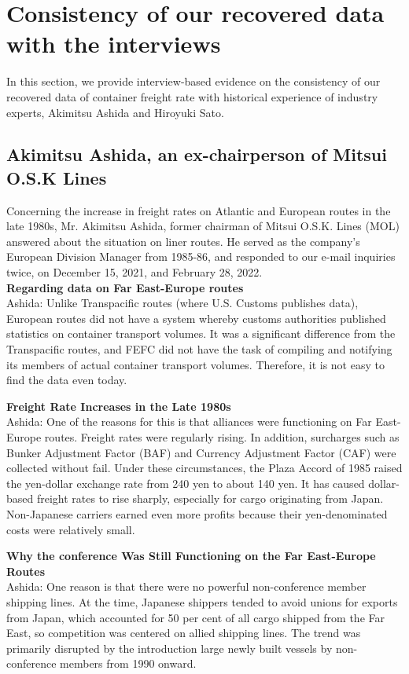 \section{Consistency of our recovered data with the interviews}\label{sec:interview}

In this section, we provide interview-based evidence on the consistency of our recovered data of container freight rate with historical experience of industry experts, Akimitsu Ashida and Hiroyuki Sato.

\subsection{Akimitsu Ashida, an ex-chairperson of Mitsui O.S.K Lines}

Concerning the increase in freight rates on Atlantic and European routes in the late 1980s, Mr. Akimitsu Ashida, former chairman of Mitsui O.S.K. Lines (MOL) answered about the situation on liner routes. He served as the company's European Division Manager from 1985-86, and responded to our e-mail inquiries twice, on December 15, 2021, and February 28, 2022.\\

\textbf{Regarding data on Far East-Europe routes} \\
Ashida: Unlike Transpacific routes (where U.S. Customs publishes data), European routes did not have a system whereby customs authorities published statistics on container transport volumes. It was a significant difference from the Transpacific routes, and FEFC did not have the task of compiling and notifying its members of actual container transport volumes. Therefore, it is not easy to find the data even today.


\textbf{Freight Rate Increases in the Late 1980s} \\
Ashida: One of the reasons for this is that alliances were functioning on Far East-Europe routes. Freight rates were regularly rising. In addition, surcharges such as Bunker Adjustment Factor (BAF) and Currency Adjustment Factor (CAF) were collected without fail. Under these circumstances, the Plaza Accord of 1985 raised the yen-dollar exchange rate from 240 yen to about 140 yen. It has caused dollar-based freight rates to rise sharply, especially for cargo originating from Japan. Non-Japanese carriers earned even more profits because their yen-denominated costs were relatively small.


\textbf{Why the conference Was Still Functioning on the Far East-Europe Routes}\\
Ashida: One reason is that there were no powerful non-conference member shipping lines. At the time, Japanese shippers tended to avoid unions for exports from Japan, which accounted for 50 per cent of all cargo shipped from the Far East, so competition was centered on allied shipping lines. The trend was primarily disrupted by the introduction large newly built vessels by non-conference members from 1990 onward.


